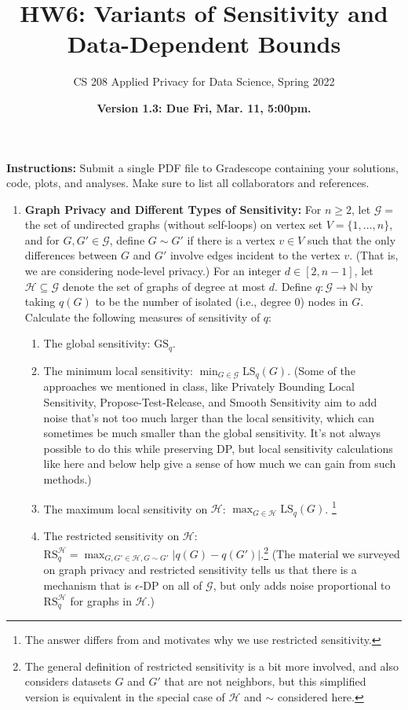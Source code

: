 \documentclass[11pt]{article}
\title{\vspace{-1.5cm} HW6: Variants of Sensitivity and Data-Dependent Bounds}
\author{CS 208 Applied Privacy for Data Science, Spring 2022}
\date{\textbf{Version 1.3: Due Fri, Mar. 11, 5:00pm.}}
\newcommand{\instructions}{\noindent \textbf{Instructions:} Submit a single PDF file to Gradescope containing your solutions, code, plots, and analyses. Make sure to list all collaborators and references.}
\theoremstyle{plain}
\theoremstyle{definition}
\theoremstyle{solution}
\newcommand{\N}{\mathbb{N}}
\newcommand{\eps}{\epsilon}
\newcommand{\cH}{\mathcal{H}}
\newcommand{\cG}{\mathcal{G}}
\newcommand{\GS}{\mathrm{GS}}
\newcommand{\LS}{\mathrm{LS}}
\newcommand{\RS}{\mathrm{RS}}
\begin{document}
\maketitle

\instructions

\begin{enumerate}[leftmargin=*]

\item \textbf{Graph Privacy and Different Types of Sensitivity:} 
For $n\geq 2$, let $\cG = $ the set of undirected graphs (without self-loops) on vertex set $V=\{1,\ldots,n\}$, and for $G,G'\in \cG$, define $G\sim G'$ if there is a vertex $v\in V$ such that the only differences between $G$ and $G'$ involve edges incident to the vertex $v$.  (That is, we are considering node-level privacy.)
For an integer $d\in [2,n-1]$, let $\cH \subseteq \cG$ denote the set of graphs of degree at most $d$.
Define $q : \cG \rightarrow \N$ by taking $q(G)$ to be the number of isolated (i.e., degree $0$) nodes in $G$.
Calculate the following measures of sensitivity of $q$:
\begin{enumerate}
    \item The global sensitivity: $\GS_q$.
    \item The minimum local sensitivity: $\min_{G\in \cG} \LS_q(G)$. (Some of the approaches we mentioned in class, like Privately Bounding Local Sensitivity, Propose-Test-Release, and Smooth Sensitivity aim to add noise that's not too much larger than the local sensitivity, which can sometimes be much smaller than the global sensitivity.  It's not always possible to do this while preserving DP, but local sensitivity calculations like here and below help give a sense of how much we can gain from such methods.) 
    \item The maximum local sensitivity on $\cH$: $\max_{G\in \cH} \LS_q(G)$. \footnote{The answer differs from and motivates why we use restricted sensitivity.}
    \item The restricted sensitivity on $\cH$: $\RS_q^{\cH} = \max_{G,G'\in \cH, G\sim G'} |q(G)-q(G')|$.\footnote{The general definition of restricted sensitivity is a bit more involved, and also considers datasets $G$ and $G'$ that are not neighbors, but this simplified version is equivalent in the special case of $\cH$ and $\sim$ considered here.}
    (The material we surveyed on graph privacy and restricted sensitivity tells us that there is a mechanism that is $\eps$-DP on all of $\cG$, but only adds noise proportional to $\RS_q^{\cH}$ for graphs in $\cH$.)
\end{enumerate}


\end{enumerate}
\end{document}
